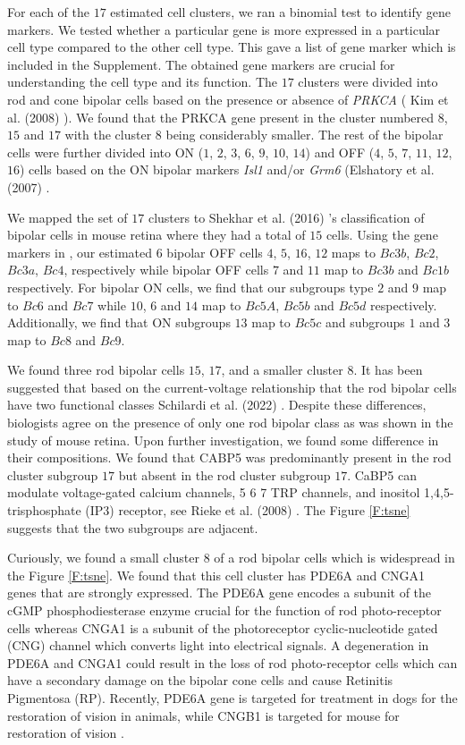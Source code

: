 \documentclass[11pt]{article}
\begin{document}
For each of the $17$ estimated cell clusters, we ran a binomial test to identify gene markers. We tested whether a particular gene is more expressed in a particular cell type compared to the other cell type. This gave a list of gene marker which is included in the Supplement. The obtained gene markers are crucial for understanding the cell type and its function. The $17$ clusters were divided into rod and cone bipolar cells based on the presence or absence of \emph{PRKCA} ( Kim et al. (2008) \cite{kim2008}). We found that the PRKCA gene present in the cluster numbered $8$, $15$ and $17$ with the cluster $8$ being considerably smaller. The rest of the bipolar cells were further divided into ON ($1$, $2$, $3$, $6$, $9$, $10$, $14$) and OFF ($4$, $5$, $7$, $11$, $12$, $16$) cells based on the ON bipolar markers \emph{Isl1} and/or \emph{Grm6} (Elshatory et al. (2007) \cite{elshatory2007}.

 We mapped the set of $17$ clusters to Shekhar et al. (2016) \cite{shekhar2016}'s classification of bipolar cells in mouse retina where they had a total of $15$ cells. Using the gene markers in \cite{shekhar2016}, our estimated $6$ bipolar OFF cells $4$, $5$, $16$, $12$ maps to $Bc3b$, $Bc2$, $Bc3a$, $Bc4$, respectively while bipolar OFF cells $7$ and $11$ map to $Bc3b$ and $Bc1b$ respectively. For bipolar ON cells, we find that our subgroups type $2$ and $9$ map to $Bc6$ and $Bc7$ while $10$, $6$ and $14$ map to $Bc5A$, $Bc 5b$ and $Bc5d$ respectively. Additionally, we find that ON subgroups $13$ map to $Bc5c$ and subgroups $1$ and $3$ map to $Bc8$ and $Bc9$. 

We found three rod bipolar cells $15$, $17$, and a smaller cluster $8$. It has been suggested that based on the current-voltage relationship that the rod bipolar cells have two functional classes Schilardi et al. (2022) \cite{schilardi2022}. Despite these differences, biologists agree on the presence of only one rod bipolar class as was shown in the study of mouse retina. Upon further investigation, we found some difference in their compositions. We found that CABP5 was predominantly present in the rod cluster subgroup $17$ but absent in the rod cluster subgroup $17$. CaBP5 can modulate voltage-gated calcium channels, 5 6 7 TRP channels, and inositol 1,4,5-trisphosphate (IP3) receptor, see Rieke et al. (2008) \cite{rieke2008}. The Figure \ref{F:tsne} suggests that the two subgroups are adjacent.

Curiously, we found a small cluster $8$ of a rod bipolar cells which is widespread in the Figure \ref{F:tsne}. We found that this cell cluster has PDE6A and CNGA1 genes that are strongly expressed.  The PDE6A gene encodes a subunit of the cGMP phosphodiesterase enzyme crucial for the function of rod photo-receptor cells whereas CNGA1 is a subunit of the photoreceptor cyclic-nucleotide gated (CNG) channel which converts light into electrical signals. A degeneration in PDE6A and CNGA1 could result in the loss of rod photo-receptor cells which can have a secondary damage on the bipolar cone cells and cause Retinitis Pigmentosa (RP). Recently, PDE6A gene is targeted for treatment in dogs for the restoration of vision in animals, \cite{mowat2017} while CNGB1 is targeted for mouse for restoration of vision \cite{CNGB1}.
\end{document}
